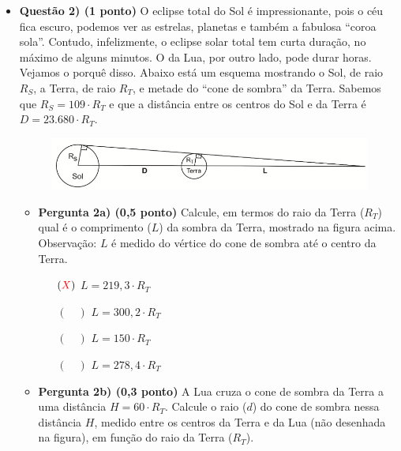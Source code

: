 \documentclass[a4paper, 12pt]{article}
\newcommand{\red}[1]{\textcolor{red}{#1}}
\begin{document}
\begin{flushleft}
\begin{itemize}
            \item \textbf{Questão 2) (1 ponto)} O eclipse total do Sol é impressionante, pois o céu fica escuro, podemos ver as estrelas, planetas e também a fabulosa ``coroa sola''. Contudo, infelizmente, o eclipse solar total tem curta duração, no máximo de alguns minutos. O da Lua, por outro lado, pode durar horas. Vejamos o porquê disso. \linebreak \linebreak Abaixo está um esquema mostrando o Sol, de raio $R_S$, a Terra, de raio $R_T$, e metade do ``cone de sombra'' da Terra. Sabemos que $R_S = 109 \cdot R_T$ e que a distância entre os centros do Sol e da Terra é $D = 23.680 \cdot R_T$.
                \begin{figure}[H]
                    \centering
                    \includegraphics[scale=0.5]{img/2a.png}
                \end{figure}
                \begin{itemize}
                    \item \textbf{Pergunta 2a) (0,5 ponto)} Calcule, em termos do raio da Terra ($R_T$) qual é o comprimento ($L$) da sombra  da  Terra,  mostrado  na  figura acima. Observação: $L$  é  medido  do  vértice  do  cone  de sombra até o centro da Terra.
                        \begin{itemize}
                            \item[$(\red{X})$] $L = 219,3 \cdot R_T$
                            \item[$(\quad)$] $L = 300,2 \cdot R_T$
                            \item[$(\quad)$] $L = 150 \cdot R_T$
                            \item[$(\quad)$] $L = 278,4 \cdot R_T$
                        \end{itemize}
                    \item \textbf{Pergunta 2b) (0,3 ponto)} A  Lua cruza  o  cone  de  sombra  da  Terra  a uma distância $H = 60 \cdot R_T$. Calcule o raio ($d$) do cone de sombra nessa distância $H$, medido entre os centros da Terra e da Lua (não desenhada na figura), em função do raio da Terra ($R_T$).
                        \begin{figure}[H]

\end{figure}
\end{itemize}
\end{itemize}
\end{flushleft}
\end{document}
